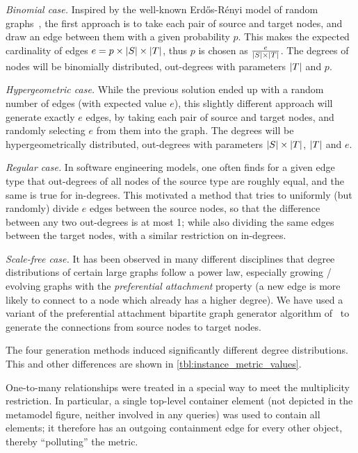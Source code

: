   \emph{Binomial case.} Inspired by the well-known Erdős-Rényi model of random
  graphs~\cite{erdos1960erg}, the first approach is to take each pair of source and
  target nodes, and draw an edge between them with a given probability $p$. This makes the
  expected cardinality of edges $e = p \times |{S}| \times |{T}|$, thus $p$
  is chosen as $\frac{e}{|{S}| \times |{T}|}$. The degrees of nodes will be
  binomially distributed, \eg out-degrees with parameters $|{T}|$ and $p$.
  
  \emph{Hypergeometric case.} While the previous solution ended up with a
  random number of edges (with expected value $e$), this slightly different
  approach will generate exactly $e$ edges, by taking each pair of source and
  target nodes, and randomly selecting $e$ from them into the graph. The degrees
  will be hypergeometrically distributed, \eg out-degrees with parameters
  $|{S}| \times |{T}|$, $|{T}|$ and $e$.
    
  \emph{Regular case.} In software engineering models, one often finds for a
  given edge type that out-degrees of all nodes of the source type are roughly
  equal, and the same is true for in-degrees. This motivated a method that tries
  to uniformly (but randomly) divide $e$ edges between the source nodes, so that
  the difference between any two out-degrees is at most 1; while also dividing
  the same edges between the target nodes, with a similar restriction on
  in-degrees.
  
  \emph{Scale-free case.} It has been observed in many different disciplines
  that degree distributions of certain large graphs follow a power law,
  especially growing / evolving graphs with the \emph{preferential attachment}
  property (a new edge is more likely to connect to a node which already has a
  higher degree). We have used a variant of the preferential attachment
  bipartite graph generator algorithm of~\cite{RandomNetworkGeneration2005} to
  generate the connections from source nodes to target nodes.
 
The four generation methods induced significantly different degree
distributions. 
This and other differences are shown in \autoref{tbl:instance_metric_values}.
 
One-to-many relationships were treated in a special way to meet the multiplicity
restriction. In particular, a single top-level container element (not depicted
in the metamodel figure, neither involved in any queries) was used to contain
all elements; it therefore has an outgoing containment edge for every other
object, thereby ``polluting'' the  metric.

